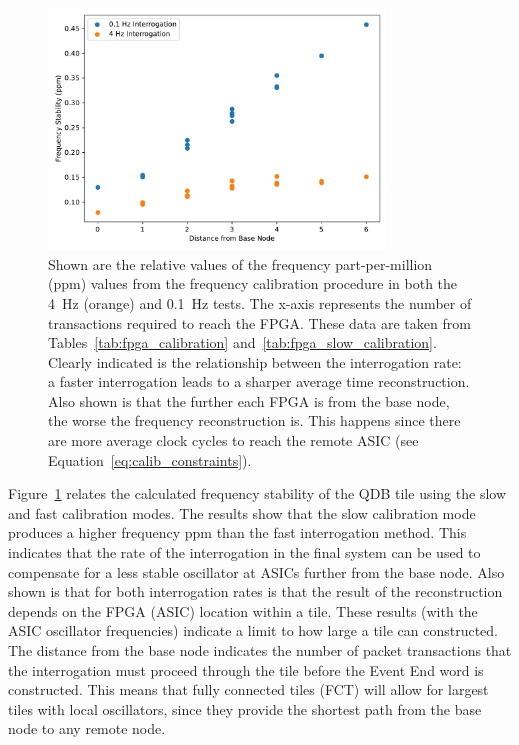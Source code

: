 \begin{figure}[]
\centering
\includegraphics[width=0.8\textwidth]{images/interrogation_ppm_diff.pdf}
\caption{Shown are the relative values of the frequency part-per-million (ppm) values from the frequency calibration procedure in both the 4~\unit{Hz} (orange) and 0.1~\unit{Hz} tests.
The x-axis represents the number of transactions required to reach the FPGA.
These data are taken from Tables~\ref{tab:fpga_calibration} and~\ref{tab:fpga_slow_calibration}.
Clearly indicated is the relationship between the interrogation rate: a faster interrogation leads to a sharper average time reconstruction.
Also shown is that the further each FPGA is from the base node, the worse the frequency reconstruction is.
This happens since there are more average clock cycles to reach the remote ASIC (see Equation~\ref{eq:calib_constraints}).
}
\label{fig:calibration_position}
\end{figure}

Figure~\ref{fig:calibration_position} relates the calculated frequency stability of the QDB tile using the slow and fast calibration modes.
The results show that the slow calibration mode produces a higher frequency ppm than the fast interrogation method. 
This indicates that the rate of the interrogation in the final system can be used to compensate for a less stable oscillator at ASICs further from the base node.
Also shown is that for both interrogation rates is that the result of the reconstruction depends on the FPGA (ASIC) location within a tile.
These results (with the ASIC oscillator frequencies) indicate a limit to how large a tile can constructed.
The distance from the base node indicates the number of packet transactions that the interrogation must proceed through the tile before the Event End word is constructed.
This means that fully connected tiles (FCT) will allow for largest tiles with local oscillators, since they provide the shortest path from the base node to any remote node.


